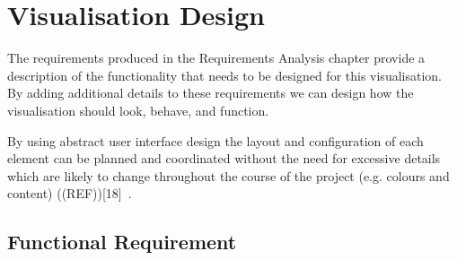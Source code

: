 \section{Visualisation Design}
The requirements produced in the Requirements Analysis chapter provide a
description of the functionality that needs to be designed for this
visualisation. By adding additional details to these requirements we can design
how the visualisation should look, behave, and function.

By using abstract user interface design the layout and configuration of each
element can be
planned and coordinated without the need for excessive details which are likely
to change
throughout the course of the project (e.g. colours and content) ((REF))[18]~.

\subsection{Functional Requirement}
